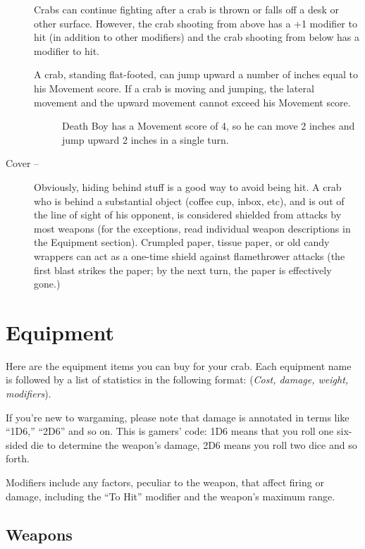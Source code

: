 \documentclass[a4paper,10pt]{article}
\begin{document}
\begin{description}
 Crabs can continue fighting after a crab is thrown or falls off a desk or other surface. However, the crab shooting from above has a +1 modifier to hit (in addition to other modifiers) and the crab shooting from below has a  modifier to hit.

 A crab, standing flat-footed, can jump upward a number of inches equal to his Movement score. If a crab is moving and jumping, the lateral movement and the upward movement cannot exceed his Movement score.

 \begin{description}
  \item[] Death Boy has a Movement score of 4, so he can move 2 inches and jump upward 2 inches in a single turn.
  \end{description}

 \item [Cover --] Obviously, hiding behind stuff is a good way to avoid being hit. A crab who is behind a substantial object (coffee cup, inbox, etc), and is out of the line of sight of his opponent, is considered shielded from attacks by most weapons (for the exceptions, read individual weapon descriptions in the Equipment section). Crumpled paper, tissue paper, or old candy wrappers can act as a one-time shield against flamethrower attacks (the first blast strikes the paper; by the next turn, the paper is effectively gone.)
\end{description}

\section*{Equipment}
\label{sec:Equipment}
Here are the equipment items you can buy for your crab. Each equipment name is followed by a list of statistics in the following format: (\textit{Cost, damage, weight, modifiers}).

If you're new to wargaming, please note that damage is annotated in terms like ``1D6,'' ``2D6'' and so on. This is gamers' code: 1D6 means that you roll one six-sided die to determine the weapon's damage, 2D6 means you roll two dice and so forth.

Modifiers include any factors, peculiar to the weapon, that affect firing or damage, including the ``To Hit'' modifier and the weapon's maximum range.

\subsection*{Weapons}
\label{sec:Weapons}
\end{document}
